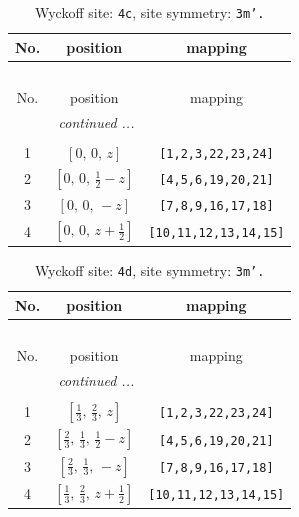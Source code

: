 \documentclass[fleqn,8pt]{jsarticle}
\begin{document}
\renewcommand{\arraystretch}{1.2}
\begin{longtable}{ccc}
\caption{Wyckoff site: {\tt 4c}, site symmetry: {\tt 3m'.}}
 \\
 \hline \hline
No. & position & mapping \\ \hline \endfirsthead

\multicolumn{2}{l}{\tablename\ \thetable{}} \\
 \hline \hline
No. & position & mapping \\ \hline \endhead

 \hline \hline
\multicolumn{2}{r}{\footnotesize\it continued ...} \\ \endfoot

 \hline \hline
\multicolumn{2}{r}{} \\ \endlastfoot

1 & $\left[ 0,\, 0,\, z \right]$ & {\tt [1,2,3,22,23,24]} \\ \hline
2 & $\left[ 0,\, 0,\, \frac{1}{2} - z \right]$ & {\tt [4,5,6,19,20,21]} \\ \hline
3 & $\left[ 0,\, 0,\, - z \right]$ & {\tt [7,8,9,16,17,18]} \\ \hline
4 & $\left[ 0,\, 0,\, z + \frac{1}{2} \right]$ & {\tt [10,11,12,13,14,15]} \\
\end{longtable}
\renewcommand{\arraystretch}{1.2}
\begin{longtable}{ccc}
\caption{Wyckoff site: {\tt 4d}, site symmetry: {\tt 3m'.}}
 \\
 \hline \hline
No. & position & mapping \\ \hline \endfirsthead

\multicolumn{2}{l}{\tablename\ \thetable{}} \\
 \hline \hline
No. & position & mapping \\ \hline \endhead

 \hline \hline
\multicolumn{2}{r}{\footnotesize\it continued ...} \\ \endfoot

 \hline \hline
\multicolumn{2}{r}{} \\ \endlastfoot

1 & $\left[ \frac{1}{3},\, \frac{2}{3},\, z \right]$ & {\tt [1,2,3,22,23,24]} \\ \hline
2 & $\left[ \frac{2}{3},\, \frac{1}{3},\, \frac{1}{2} - z \right]$ & {\tt [4,5,6,19,20,21]} \\ \hline
3 & $\left[ \frac{2}{3},\, \frac{1}{3},\, - z \right]$ & {\tt [7,8,9,16,17,18]} \\ \hline
4 & $\left[ \frac{1}{3},\, \frac{2}{3},\, z + \frac{1}{2} \right]$ & {\tt [10,11,12,13,14,15]} \\
\end{longtable}
\end{document}
